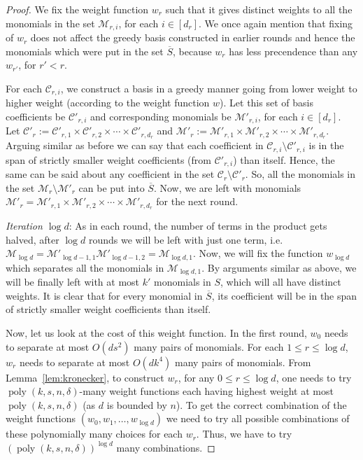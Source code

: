\documentclass[final,oneeqnum, onethmnum, onefignum]{siamltex1213}
\newcommand{\C}{\mathcal C}
\newcommand{\M}{\mathcal M}
\newcommand{\degree}{\delta} %
\DeclareMathOperator{\poly}{poly}
\renewcommand{\o}[1]{\overline{#1}}
\begin{document}
\begin{proof}
We fix the weight function $w_r$ such that it gives distinct weights to
all the monomials in the set $\M_{r,i}$, for each $i \in [d_r]$.
We once again mention that fixing of $w_r$ does not affect 
the greedy basis constructed in earlier rounds 
and hence the monomials which were put in the set $\o{S}$,
because $w_r$ has less precendence than any $w_{r'}$, for $r' < r$.

For each $\C_{r,i}$, we construct a basis in a greedy manner 
going from lower weight to higher weight 
(according to the weight function $w$).
Let this set of basis coefficients be $\C'_{r,i}$ and corresponding
monomials be $\M'_{r,i}$, for each $i \in [d_r]$.
Let $\C'_{r}  := \C'_{r,1} \times \C'_{r,2} \times \dotsm \times \C'_{r,d_r}$
and $\M'_{r} := \M'_{r,1} \times \M'_{r,2} \times \dotsm \times \M'_{r,d_r}$.
Arguing similar as before we can say that
 each coefficient in $\C_{r,i} \setminus \C'_{r,i}$ 
is in the span of strictly smaller weight coefficients (from $\C'_{r,i}$) than itself.
Hence, the same can be said about any coefficient in the set  
$\C_r \setminus \C'_r$. 
So, all the monomials in the set
$\M_r \setminus \M'_r$
can be put into $\o{S}$.
Now, we are left with monomials 
$\M'_r = \M'_{r,1} \times \M'_{r,2} \times \dotsm \times \M'_{r,d_r}$
for the next round. 

{\em Iteration $\log d$}: As in each round, the number of terms in the product gets halved,
after $\log d$ rounds we will be left with just one term,
i.e.\ $\M_{\log d} = \M'_{\log d -1, 1} \M'_{\log d -1 ,2} = \M_{\log d ,1}$. 
Now, we will fix the function $w_{\log d}$ which separates
all the monomials in $\M_{\log d, 1}$.
By arguments similar as above, we will be finally left with
at most $k'$ monomials in $S$, which will all have distinct weights. 
It is clear that for every monomial in $\o{S}$, its coefficient will be in 
the span of strictly smaller weight coefficients than itself.

Now, let us look at the cost of this weight function. 
In the first round, $w_0$ needs to separate at most 
$O(d s^2)$ many pairs of monomials. 
For each $1 \leq r \leq \log d$, $w_r$ 
needs to separate at most $O(dk^4)$ many pairs of monomials. 
From Lemma~\ref{lem:kronecker}, to construct $w_r$, for any $0 \leq r \leq \log d$,
one needs to try $\poly(k, s, n, \degree)$-many weight functions
each having highest weight at most $\poly(k, s, n, \degree)$ 
(as $d$ is bounded by $n$). 
To get the correct combination of the weight functions $(w_0, w_1, \dots, w_{\log d})$
we need to try all possible combinations of these polynomially many choices 
for each $w_r$.
Thus, we have to try $(\poly(k, s, n, \degree))^{\log d}$ many combinations. 


\end{proof}
\end{document}
